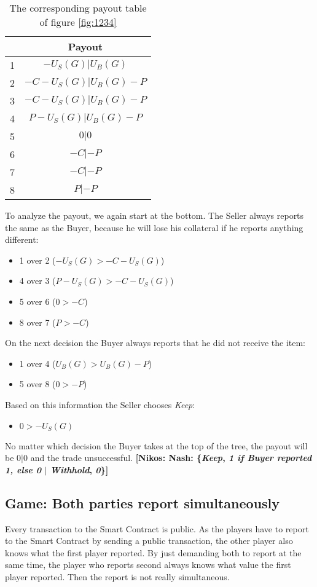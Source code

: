 \documentclass{cacthesis}
\newcommand{\authnote}[3]{{ \footnotesize \textbf{#1[#2: #3]~}}}
\newcommand{\niknote}[1]{\authnote{\color{red}}{Nikos}{#1}}
\begin{document}
\begin{table}[htb!]
\centering
\begin{tabular}{ |c|c| }
\hline
& Payout  \\
\hline
\hline
1& $-U_S(G)| U_B(G)$\\
\hline
2& $-C-U_S(G)| U_B(G)-P$\\
\hline
3&$-C-U_S(G)|U_B(G) -P$ \\
\hline
4& $P-U_S(G)| U_B(G) - P$\\
\hline
5& $0|0$\\
\hline 
6& $-C | -P$\\
\hline
7& $-C|-P$\\
\hline
8& $P| -P$\\
\hline
\end{tabular}
\caption{The corresponding payout table of figure \ref{fig:1234}}
\end{table}

To analyze the payout, we again start at the bottom. The Seller always reports the same as the Buyer, because he will lose his collateral if he reports anything different:
\begin{itemize}
    \item 1 over 2 ($-U_S(G)>-C - U_S(G)$)
    \item 4 over 3 ($P-U_S(G)> -C-U_S(G)$)
    \item 5 over 6 ($0 > -C$)
    \item 8 over 7 ($P > -C$)
\end{itemize}
On the next decision the Buyer always reports that he did not receive the item:
\begin{itemize}
    \item 1 over 4 ($U_B(G)>U_B(G) - P$)
    \item 5 over 8 ($0>-P$)
\end{itemize}
Based on this information the Seller chooses \emph{Keep}:
\begin{itemize}
    \item $0 > -U_S(G)$
\end{itemize}
No matter which decision the Buyer takes at the top of the tree, the payout will be $0|0$ and the trade unsuccessful.
\niknote{Nash: \{\emph{Keep}, \emph{1 if Buyer reported 1, else 0} $|$ \emph{Withhold}, \emph{0}\}}

\subsection{Game: Both parties report simultaneously}
 Every transaction to the Smart Contract is public. As the players have to
 report to the Smart Contract by sending a public transaction, the other player
 also knows what the first player reported. By just demanding both to report at
 the same time, the player who reports second always knows what value the first player reported. Then the report is not really simultaneous.\newline
\end{document}
